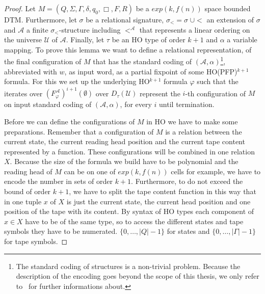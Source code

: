 \begin{proof}
    Let $M = (Q, \Sigma, \Gamma, \delta, q_0, \Box, F, R)$ be a $exp(k, f(n))$ space bounded DTM. Furthermore, let $\sigma$ be a relational signature, $\sigma_< = \sigma\;\cup
    <$ an extension of $\sigma$ and $\mathcal{A}$ a finite $\sigma_<$-structure including $<^\mathcal{A}$ that
    represents a linear ordering on the universe $\mathcal{U}$ of $\mathcal{A}$. Finally, let $\tau$ be an HO type of
    order $k + 1$ and $\alpha$ a variable mapping.
    To prove this lemma we want to define a relational representation, of the final configuration of $M$ that has the standard coding of $(\mathcal{A}, \alpha)$\footnote{The standard coding of structures is a non-trivial problem. Because the description of the encoding goes beyond the scope of this thesis, we only refer to~\cite{abiteboul1995computing} for further informations about.}, abbreviated with $w$, as input word,
    as a partial fixpoint of some HO(PFP)$^{k+1}$ formula. For this we set up the underlying HO$^{k+1}$ formula
    $\varphi$ such that the iterates over $(F_\varphi^\mathcal{A})^{i+1}(\emptyset)$ over $D_\tau
    (\mathcal{U})$ represent the $i$-th configuration of $M$ on input standard coding of $(\mathcal{A}, \alpha)$, for every $i$ until termination.

    Before we can define the configurations of $M$ in HO we have to make some preparations. Remember that a
    configuration of $M$ is a relation between the current state, the current reading head position and
    the current tape content represented by a function. These configurations will be combined in one relation $X$.
    Because the size of the formula we build have to be polynomial and the reading head of $M$ can be on
    one of $exp(k, f(n))$ cells for example, we have to encode the number in sets of order $k + 1$. Furthermore, to do
    not exceed the bound of order $k + 1$, we have to split the tape content function in this way that in one tuple
    $x$ of $X$ is just the current state, the current head position and one position of the tape with its content. By
    syntax of HO types each component of $x \in X$ have to be of the same type, so to access the different states and
    tape symbols they have to be numerated. $\{0, \dots, |Q| - 1\}$ for states and $\{0, \dots, |\Gamma| - 1\}$ for tape
    symbols.


\end{proof}
